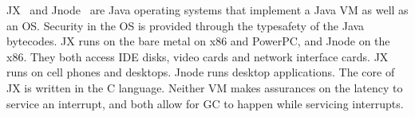 \documentclass{sigplanconf}
\def\remark#1{\marginpar{\raggedright\hbadness=10000
        \def\baselinestretch{0.8}\scriptsize
        \it #1\par}}
\begin{document}
JX~\cite{Golm02} and Jnode~\cite{Lohm05} are Java operating
systems that implement a Java VM as well as an OS.  Security
in the OS is provided through the typesafety of the Java bytecodes.
JX runs on the bare metal on x86 and PowerPC, and Jnode on the x86.
They both access IDE disks, video cards and network interface cards.
JX runs on cell phones and desktops.
Jnode runs desktop applications.
The core of JX is written in the C language.
Neither VM makes assurances on the latency to service an interrupt,
and both allow for GC to happen while servicing interrupts.

%
%
%
\end{document}

